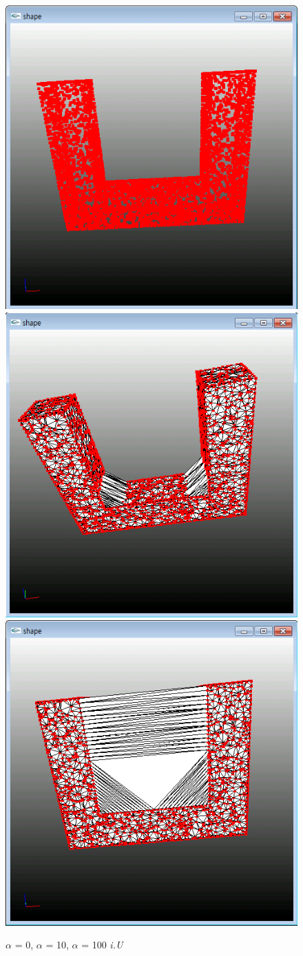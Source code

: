 \documentclass[11pt]{article}
\begin{document}
\begin{figure}[ht]
\includegraphics[width=.5\textwidth]{FIGS/alpha0-iU}
\hspace{1cm}
\includegraphics[width=.5\textwidth]{FIGS/alpha10-iU}
\vspace{1cm}
\includegraphics[width=.5\textwidth]{FIGS/alpha100-iU}
\caption{$\alpha$ = 0, $\alpha$ = 10, $\alpha$ = 100 \textit{i.U}}
\end{figure}
\end{document}
